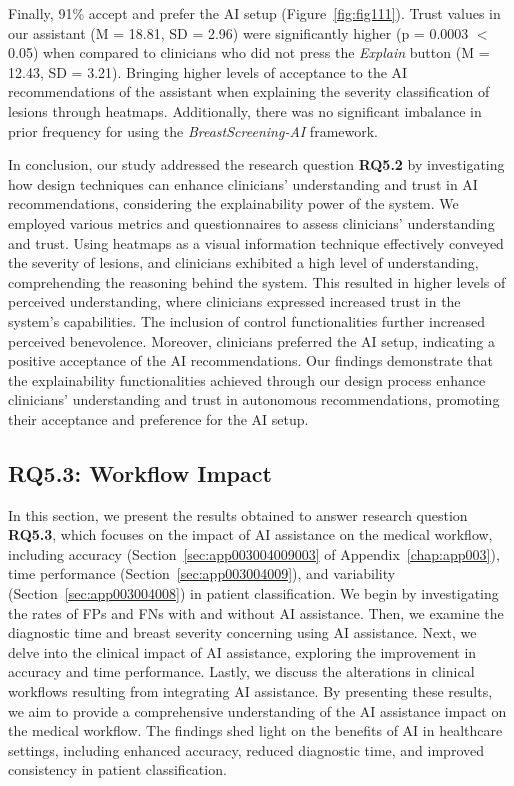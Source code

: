Finally, 91\% accept and prefer the \ac{AI} setup (Figure~\ref{fig:fig111}).
Trust values in our assistant (M = 18.81, SD = 2.96) were significantly higher (p = 0.0003 $<$ 0.05) when compared to clinicians who did not press the {\it Explain} button (M = 12.43, SD = 3.21).
Bringing higher levels of acceptance to the \ac{AI} recommendations of the assistant when explaining the severity classification of lesions through heatmaps.
Additionally, there was no significant imbalance in prior frequency for using the {\it BreastScreening-AI} framework.

In conclusion, our study addressed the research question {\bf RQ5.2} by investigating how design techniques can enhance clinicians' understanding and trust in \ac{AI} recommendations, considering the explainability power of the system.
We employed various metrics and questionnaires to assess clinicians' understanding and trust.
Using heatmaps as a visual information technique effectively conveyed the severity of lesions, and clinicians exhibited a high level of understanding, comprehending the reasoning behind the system.
This resulted in higher levels of perceived understanding, where clinicians expressed increased trust in the system's capabilities.
The inclusion of control functionalities further increased perceived benevolence.
Moreover, clinicians preferred the \ac{AI} setup, indicating a positive acceptance of the \ac{AI} recommendations.
Our findings demonstrate that the explainability functionalities achieved through our design process enhance clinicians' understanding and trust in autonomous recommendations, promoting their acceptance and preference for the \ac{AI} setup.

\subsection{RQ5.3: Workflow Impact}
\label{sec:chap005006003}

In this section, we present the results obtained to answer research question {\bf RQ5.3}, which focuses on the impact of \ac{AI} assistance on the medical workflow, including accuracy (Section~\ref{sec:app003004009003} of Appendix~\ref{chap:app003}), time performance (Section~\ref{sec:app003004009}), and variability (Section~\ref{sec:app003004008}) in patient classification.
We begin by investigating the rates of \acp{FP} and \acp{FN} with and without \ac{AI} assistance.
Then, we examine the diagnostic time and breast severity concerning using \ac{AI} assistance.
Next, we delve into the clinical impact of \ac{AI} assistance, exploring the improvement in accuracy and time performance.
Lastly, we discuss the alterations in clinical workflows resulting from integrating \ac{AI} assistance.
By presenting these results, we aim to provide a comprehensive understanding of the \ac{AI} assistance impact on the medical workflow.
The findings shed light on the benefits of \ac{AI} in healthcare settings, including enhanced accuracy, reduced diagnostic time, and improved consistency in patient classification.

